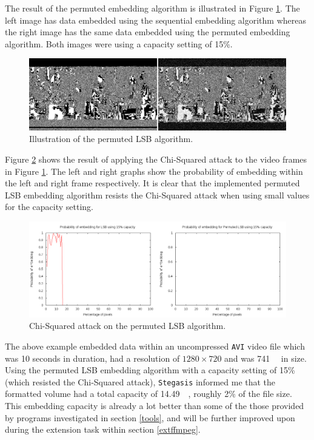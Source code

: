 \documentclass[paper=a4, fontsize=11pt,twoside]{scrartcl}
\numberwithin{table}{section}
\numberwithin{figure}{section}
\numberwithin{algorithm}{section}
\begin{document}
The result of the permuted embedding algorithm is illustrated in Figure \ref{lsbp_ill}. The left image has data embedded using the sequential embedding algorithm whereas the right image has the same data embedded using the permuted embedding algorithm. Both images were using a capacity setting of 15\%.

\begin{figure}[here]
\centerline{\includegraphics[width=\textwidth]{images/lsbp_ill.png}}
\caption{Illustration of the permuted LSB algorithm.}
\label{lsbp_ill}
\end{figure}

Figure \ref{lsbp_chi} shows the result of applying the Chi-Squared attack to the video frames in Figure \ref{lsbp_ill}. The left and right graphs show the probability of embedding within the left and right frame respectively. It is clear that the implemented permuted LSB embedding algorithm resists the Chi-Squared attack when using small values for the capacity setting. 

\begin{figure}[here]
\centerline{\includegraphics[width=\textwidth]{images/lsbp_chi.png}}
\caption{Chi-Squared attack on the permuted LSB algorithm.}
\label{lsbp_chi}
\end{figure}

\noindent
The above example embedded data within an uncompressed \texttt{AVI} video file which was 10 seconds in duration, had a resolution of $1280\times720$ and was \SI{741}{\mega\byte} in size. Using the permuted LSB embedding algorithm with a capacity setting of 15\% (which resisted the Chi-Squared attack), \texttt{Stegasis} informed me that the formatted volume had a total capacity of \SI{14.49}{\mega\byte}, roughly 2\% of the file size. This embedding capacity is already a lot better than some of the those provided by programs investigated in section \ref{tools}, and will be further improved upon during the extension task within section \ref{extffmpeg}.
\end{document}
